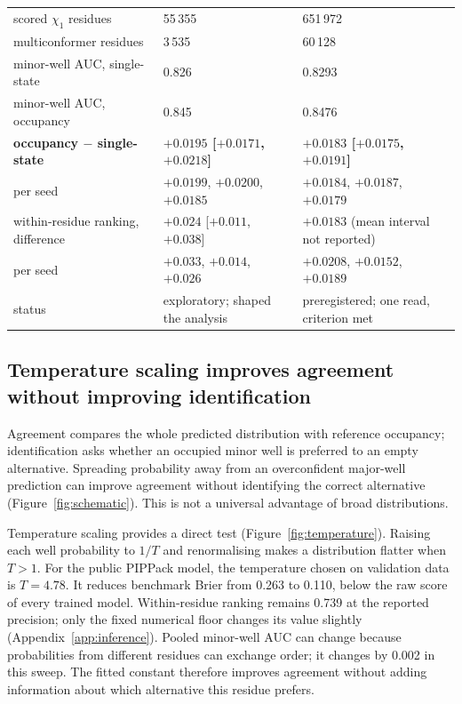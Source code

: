 \documentclass[10pt,twocolumn,a4paper]{article}
\begin{document}
\begin{table}[tb]
\begin{tabular}{@{}lll@{}}
scored $\chi_1$ residues & 55\,355 & 651\,972 \\
multiconformer residues & 3\,535 & 60\,128 \\
\midrule
minor-well AUC, single-state & 0.826 & 0.8293 \\
minor-well AUC, occupancy & 0.845 & 0.8476 \\
\textbf{occupancy $-$ single-state} & \textbf{$+0.0195$ [$+0.0171$, $+0.0218$]} & \textbf{$+0.0183$ [$+0.0175$, $+0.0191$]} \\
\quad per seed & $+0.0199$, $+0.0200$, $+0.0185$ & $+0.0184$, $+0.0187$, $+0.0179$ \\
\midrule
within-residue ranking, difference & $+0.024$ [$+0.011$, $+0.038$] & $+0.0183$ (mean interval not reported) \\
\quad per seed & $+0.033$, $+0.014$, $+0.026$ & $+0.0208$, $+0.0152$, $+0.0189$ \\
\midrule
status & exploratory; shaped the analysis & preregistered; one read, criterion met \\
\bottomrule
\end{tabular}
\end{table}\subsection{Temperature scaling improves agreement without improving identification}
\label{sec:agreement}
Agreement compares the whole predicted distribution with reference occupancy; identification asks whether an occupied minor well is preferred to an empty alternative. Spreading probability away from an overconfident major-well prediction can improve agreement without identifying the correct alternative (Figure~\ref{fig:schematic}). This is not a universal advantage of broad distributions.

Temperature scaling provides a direct test (Figure~\ref{fig:temperature}). Raising each well probability to $1/T$ and renormalising makes a distribution flatter when $T>1$. For the public PIPPack model, the temperature chosen on validation data is $T=4.78$. It reduces benchmark Brier from 0.263 to 0.110, below the raw score of every trained model. Within-residue ranking remains 0.739 at the reported precision; only the fixed numerical floor changes its value slightly (Appendix~\ref{app:inference}). Pooled minor-well AUC can change because probabilities from different residues can exchange order; it changes by 0.002 in this sweep. The fitted constant therefore improves agreement without adding information about which alternative this residue prefers.
\end{document}
